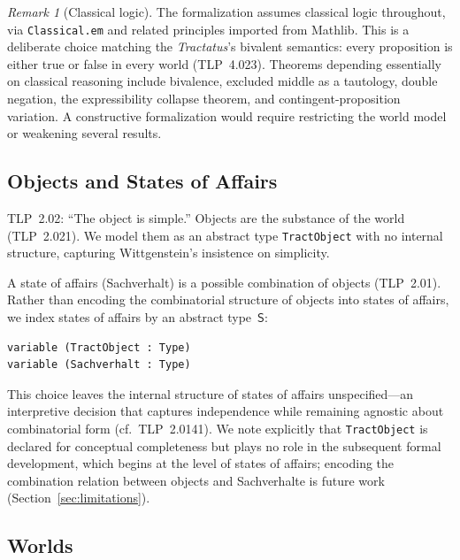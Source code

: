 \documentclass[jsl,bibother]{asl}
\theoremstyle{definition}
\theoremstyle{remark}
\newtheorem{remark}[theorem]{Remark}
\newcommand{\Sach}{\mathsf{S}}
\begin{document}
\begin{remark}[Classical logic]
\label{rem:classical}
The formalization assumes classical logic throughout, via
\texttt{Classical.em} and related principles imported from
Mathlib.  This is a deliberate choice matching the
\emph{Tractatus}'s bivalent semantics: every proposition is
either true or false in every world (TLP~4.023).
Theorems depending essentially on classical reasoning include
bivalence, excluded middle as a tautology, double negation,
the expressibility collapse theorem, and contingent-proposition
variation.  A constructive formalization would require
restricting the world model or weakening several results.
\end{remark}

\subsection{Objects and States of Affairs}
\label{sec:objects}

TLP~2.02: ``The object is simple.''  Objects are the substance
of the world (TLP~2.021).  We model them as an abstract type
\texttt{TractObject} with no internal structure, capturing
Wittgenstein's insistence on simplicity.

A state of affairs (Sachverhalt) is a possible combination of
objects (TLP~2.01).  Rather than encoding the combinatorial
structure of objects into states of affairs, we index states of
affairs by an abstract type~$\Sach$:

\begin{lstlisting}
variable (TractObject : Type)
variable (Sachverhalt : Type)
\end{lstlisting}

\noindent
This choice leaves the internal structure of states of affairs
unspecified---an interpretive decision that captures independence
while remaining agnostic about combinatorial form (cf.\
TLP~2.0141).  We note explicitly that \texttt{TractObject} is
declared for conceptual completeness but plays no role in the
subsequent formal development, which begins at the level of
states of affairs; encoding the combination relation between
objects and Sachverhalte is future work
(Section~\ref{sec:limitations}).

\subsection{Worlds}
\label{sec:worlds}
\end{document}
